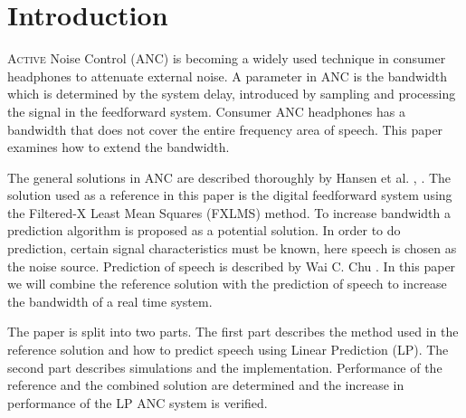 \section*{Introduction}
\lettrine[lines=2]{A}{ctive} Noise Control (ANC) is becoming a widely used technique in consumer headphones to attenuate external noise. A parameter in ANC is the bandwidth which is determined by the system delay, introduced by sampling and processing the signal in the feedforward system. Consumer ANC headphones has a bandwidth that does not cover the entire frequency area of speech. This paper examines how to extend the bandwidth.

The general solutions in ANC are described thoroughly by Hansen et al. \cite{Hansen2}, \cite{Hansen}. The solution used as a reference in this paper is the digital feedforward system using the Filtered-X Least Mean Squares (FXLMS) method. To increase bandwidth a prediction algorithm is proposed as a potential solution. In order to do prediction, certain signal characteristics must be known, here speech is chosen as the noise source. Prediction of speech is described by Wai C. Chu \cite{Speech}. In this paper we will combine the reference solution with the prediction of speech to increase the bandwidth of a real time system.  

The paper is split into two parts. The first part describes the method used in the reference solution and how to predict speech using Linear Prediction (LP). The second part describes simulations and the implementation. Performance of the reference and the combined solution are determined and the increase in performance of the LP ANC system is verified.  
        








